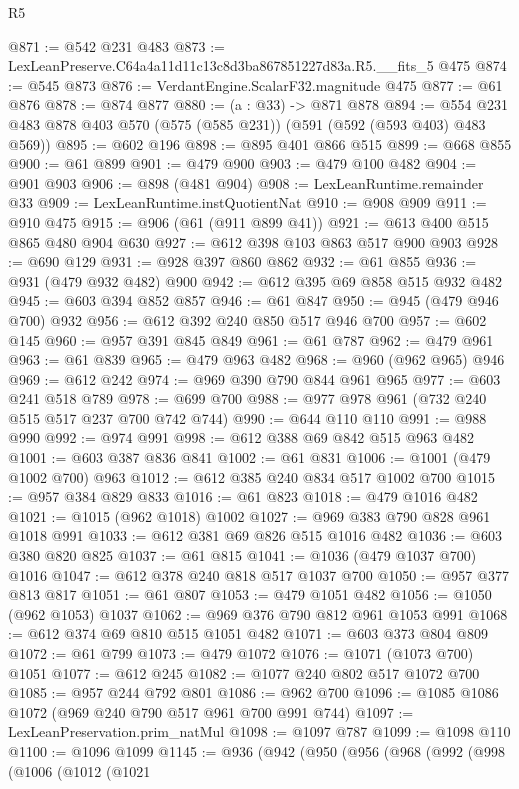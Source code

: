 \begin{lexlean}{R5}
\begin{coremodule}
@871 := @542 @231 @483
@873 := LexLeanPreserve.C64a4a11d11c13c8d3ba867851227d83a.R5.__fits_5 @475
@874 := @545 @873
@876 := VerdantEngine.ScalarF32.magnitude @475
@877 := @61 @876
@878 := @874 @877
@880 := (a : @33) -> @871 @878
@894 := @554 @231 @483 @878 @403 @570 (@575 (@585 @231)) (@591 (@592 (@593 @403) @483 @569))
@895 := @602 @196
@898 := @895 @401 @866 @515
@899 := @668 @855
@900 := @61 @899
@901 := @479 @900
@903 := @479 @100 @482
@904 := @901 @903
@906 := @898 (@481 @904)
@908 := LexLeanRuntime.remainder @33
@909 := LexLeanRuntime.instQuotientNat
@910 := @908 @909
@911 := @910 @475
@915 := @906 (@61 (@911 @899 @41))
@921 := @613 @400 @515 @865 @480 @904 @630
@927 := @612 @398 @103 @863 @517 @900 @903
@928 := @690 @129
@931 := @928 @397 @860 @862
@932 := @61 @855
@936 := @931 (@479 @932 @482) @900
@942 := @612 @395 @69 @858 @515 @932 @482
@945 := @603 @394 @852 @857
@946 := @61 @847
@950 := @945 (@479 @946 @700) @932
@956 := @612 @392 @240 @850 @517 @946 @700
@957 := @602 @145
@960 := @957 @391 @845 @849
@961 := @61 @787
@962 := @479 @961
@963 := @61 @839
@965 := @479 @963 @482
@968 := @960 (@962 @965) @946
@969 := @612 @242
@974 := @969 @390 @790 @844 @961 @965
@977 := @603 @241 @518 @789
@978 := @699 @700
@988 := @977 @978 @961 (@732 @240 @515 @517 @237 @700 @742 @744)
@990 := @644 @110 @110
@991 := @988 @990
@992 := @974 @991
@998 := @612 @388 @69 @842 @515 @963 @482
@1001 := @603 @387 @836 @841
@1002 := @61 @831
@1006 := @1001 (@479 @1002 @700) @963
@1012 := @612 @385 @240 @834 @517 @1002 @700
@1015 := @957 @384 @829 @833
@1016 := @61 @823
@1018 := @479 @1016 @482
@1021 := @1015 (@962 @1018) @1002
@1027 := @969 @383 @790 @828 @961 @1018 @991
@1033 := @612 @381 @69 @826 @515 @1016 @482
@1036 := @603 @380 @820 @825
@1037 := @61 @815
@1041 := @1036 (@479 @1037 @700) @1016
@1047 := @612 @378 @240 @818 @517 @1037 @700
@1050 := @957 @377 @813 @817
@1051 := @61 @807
@1053 := @479 @1051 @482
@1056 := @1050 (@962 @1053) @1037
@1062 := @969 @376 @790 @812 @961 @1053 @991
@1068 := @612 @374 @69 @810 @515 @1051 @482
@1071 := @603 @373 @804 @809
@1072 := @61 @799
@1073 := @479 @1072
@1076 := @1071 (@1073 @700) @1051
@1077 := @612 @245
@1082 := @1077 @240 @802 @517 @1072 @700
@1085 := @957 @244 @792 @801
@1086 := @962 @700
@1096 := @1085 @1086 @1072 (@969 @240 @790 @517 @961 @700 @991 @744)
@1097 := LexLeanPreservation.prim_natMul
@1098 := @1097 @787
@1099 := @1098 @110
@1100 := @1096 @1099
@1145 := @936
    (@942
      (@950
        (@956
          (@968
            (@992
              (@998
                (@1006
                  (@1012
                    (@1021

\end{coremodule}
\end{lexlean}

